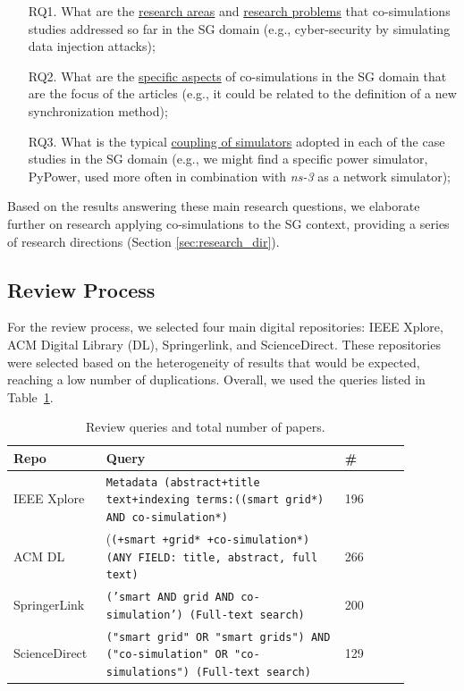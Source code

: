 \documentclass[1p]{elsarticle} %
\begin{document}
\begin{enumerate}
    \item[RQ1.] What are the \underline{research areas} and \underline{research problems} that co-simulations studies addressed so far in the SG domain (e.g., cyber-security by simulating data injection attacks);
    \item[RQ2.] What are the \underline{specific aspects} of co-simulations in the SG domain that are the focus of the articles (e.g., it could be related to the definition of a new synchronization method);
    \item[RQ3.] What is the typical \underline{coupling of simulators} adopted in each of the case studies in the SG domain (e.g., we might find a specific power simulator, PyPower, used more often in combination with \textit{ns-3} as a network simulator);
\end{enumerate}

\noindent Based on the results answering these main research questions, we elaborate further on research applying co-simulations to the SG context, providing a series of research directions (Section \ref{sec:research_dir}).

 \subsection{Review Process}

For the review process, we selected four main digital repositories: IEEE Xplore, ACM Digital Library (DL), Springerlink, and ScienceDirect. These repositories were selected based on the heterogeneity of results that would be expected, reaching a low number of duplications.  Overall, we used the queries listed in Table~\ref{tbl:queries}.

\begin{table}[!htbp]
\caption{Review queries and total number of papers.}
\label{tbl:queries}
\footnotesize
\begin{tabular}{p{0.18\linewidth}p{0.55\linewidth}p{0.15\linewidth}}
\toprule
\textbf{Repo} &  \textbf{Query}&  \textbf{\#}\\ 
\midrule
IEEE Xplore & \texttt{Metadata (abstract+title text+indexing terms:((smart grid*) AND co-simulation*)} & 196 \\
ACM DL & (\texttt{(+smart +grid* +co-simulation*) (ANY FIELD: title, abstract, full text)} & 266 \\
SpringerLink &  \texttt{('smart AND grid AND co-simulation') (Full-text search)}  & 200\\
ScienceDirect & \texttt{("smart grid" OR "smart grids") AND ("co-simulation" OR "co-simulations") (Full-text search)} & 129\\
\bottomrule
\end{tabular}
\end{table}
\end{document}
